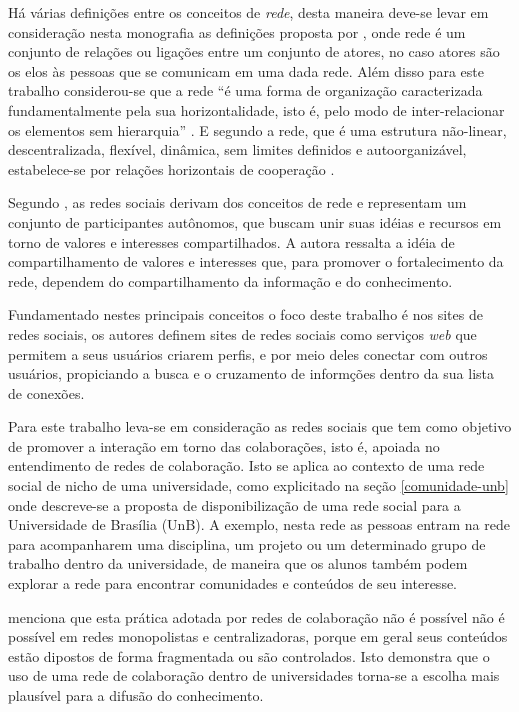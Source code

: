 Há várias definições entre os conceitos de \textit{rede}, desta maneira deve-se levar em consideração nesta monografia as definições proposta por \cite{emirbayer1994network}, onde rede é um conjunto de relações ou ligações entre um conjunto de atores, no caso atores são os elos às pessoas que se comunicam em uma dada rede. Além disso para este trabalho considerou-se que a rede “é uma forma de organização caracterizada fundamentalmente pela sua horizontalidade, isto é, pelo modo de inter-relacionar os elementos sem hierarquia” \cite[p. 73]{costa2004redes}. E segundo  a rede, que é uma estrutura não-linear, descentralizada, flexível, dinâmica, sem limites definidos e autoorganizável, estabelece-se por relações horizontais de cooperação .

Segundo \cite{marteleto2001analise}, as redes sociais derivam dos conceitos de rede e representam um conjunto de participantes autônomos, que buscam unir suas idéias e recursos em torno de valores e interesses compartilhados. A autora ressalta a idéia de compartilhamento de valores e interesses que, para promover o fortalecimento da rede, dependem do compartilhamento da informação e do conhecimento.

Fundamentado nestes principais conceitos o foco deste trabalho é nos sites de redes sociais, os autores  definem sites de redes sociais como serviços \textit{web} que permitem a seus usuários criarem perfis, e por meio deles conectar com outros usuários, propiciando a busca e o cruzamento de informções dentro da sua lista de conexões.

Para este trabalho leva-se em consideração as redes sociais que tem como objetivo de promover a interação em torno das colaborações, isto é, apoiada no entendimento de redes de colaboração. Isto se aplica ao contexto de uma rede social de nicho de uma universidade, como explicitado na seção \ref{comunidade-unb} onde descreve-se a proposta de disponibilização de uma rede social para a Universidade de Brasília (UnB). A exemplo, nesta rede as pessoas entram na rede para acompanharem uma disciplina, um projeto ou um determinado grupo de trabalho dentro da universidade, de maneira que os alunos também podem explorar a rede para encontrar comunidades e conteúdos de seu interesse.

 menciona que esta prática adotada por redes de colaboração não é possível não é possível em redes monopolistas e centralizadoras, porque em geral seus conteúdos estão dipostos de forma fragmentada ou são controlados. Isto demonstra que o uso de uma rede de colaboração dentro de universidades torna-se a escolha mais plausível para a difusão do conhecimento.


